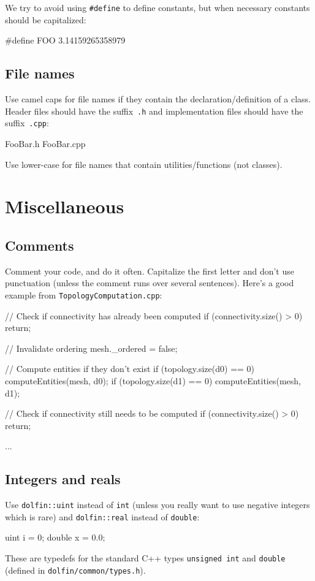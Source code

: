 We try to avoid using \texttt{\#define} to define constants, but when
necessary constants should be capitalized:
\begin{code}
#define FOO 3.14159265358979
\end{code}

\subsection{File names}

Use camel caps for file names if they contain the
declaration/definition of a class. Header files should have the
suffix~\texttt{.h} and implementation files should have the
suffix~\texttt{.cpp}:
\begin{code}
FooBar.h
FooBar.cpp
\end{code}

Use lower-case for file names that contain utilities/functions (not
classes).

\section{Miscellaneous}

\subsection{Comments}

Comment your code, and do it often. Capitalize the first letter and
don't use punctuation (unless the comment runs over several
sentences). Here's a good example from \texttt{TopologyComputation.cpp}:
\begin{code}
// Check if connectivity has already been computed
if (connectivity.size() > 0)
  return;

// Invalidate ordering
mesh._ordered = false;

// Compute entities if they don't exist
if (topology.size(d0) == 0)
  computeEntities(mesh, d0);
if (topology.size(d1) == 0)
  computeEntities(mesh, d1);

// Check if connectivity still needs to be computed
if (connectivity.size() > 0)
  return;

...
\end{code}

\subsection{Integers and reals}

Use \texttt{dolfin::uint} instead of \texttt{int} (unless you really
want to use negative integers which is rare) and \texttt{dolfin::real}
instead of \texttt{double}:
\begin{code}
uint i = 0;
double x = 0.0;
\end{code}
These are typedefs for the standard C++ types \texttt{unsigned int}
and \texttt{double} (defined in \texttt{dolfin/common/types.h}).

